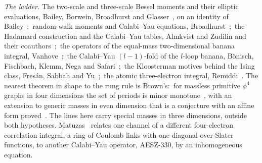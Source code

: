 \documentclass[aps,pra,twocolumn,superscriptaddress,longbibliography]{revtex4-2}
\begin{document}
\emph{The ladder.}  The two-scale and three-scale Bessel moments and
their elliptic evaluations, Bailey, Borwein, Broadhurst and
Glasser~\cite{bbbg2008}, on an identity of Bailey~\cite{bailey1936};\
random-walk moments and Calabi--Yau equations,
Broadhurst~\cite{broadhurst2009walks};\ the Hadamard construction and
the Calabi--Yau tables, Almkvist and Zudilin and their
coauthors~\cite{almkvist_zudilin2007,aesz2005};\ the operators of the
equal-mass two-dimensional banana integral,
Vanhove~\cite{vanhove2014};\ the Calabi--Yau $(l-1)$-fold of
the $l$-loop banana, B\"onisch, Fischbach, Klemm, Nega and
Safari~\cite{bonisch2021};\ the Kloosterman motives behind the Ising
class, Fres\'an, Sabbah and Yu~\cite{fresansabbahyu2023};\ the atomic
three-electron integral, Remiddi~\cite{remiddi1991}.
The nearest theorem in shape to the rung rule is Brown's:\ for massless
primitive $\phi^4$ graphs in four dimensions the set of periods is minor
monotone~\cite{brown2009periods}, with an extension to generic masses in
even dimension that is a conjecture with an affine form
proved~\cite{brown2015coaction}.  The lines here carry special masses in
three dimensions, outside both hypotheses.  Matuzas~\cite{matuzas2026} relates one channel of a different
four-electron correlation integral, a ring of Coulomb links with one
diagonal over Slater functions, to another Calabi--Yau operator,
AESZ-330, by an inhomogeneous equation.
\end{document}
